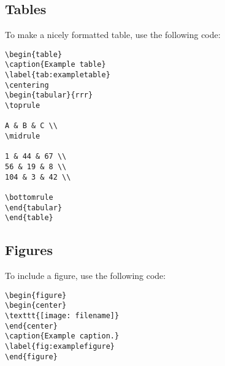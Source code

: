 \documentclass{article}
\begin{document}
\subsection{Tables}

To make a nicely formatted table, use the following code:

\begin{verbatim}
\begin{table}
\caption{Example table}
\label{tab:exampletable}
\centering
\begin{tabular}{rrr}
\toprule

A & B & C \\
\midrule

1 & 44 & 67 \\
56 & 19 & 8 \\
104 & 3 & 42 \\

\bottomrule
\end{tabular}
\end{table}
\end{verbatim}

\subsection{Figures}

To include a figure, use the following code:
\begin{verbatim}
\begin{figure}
\begin{center}
\texttt{[image: filename]}
\end{center}
\caption{Example caption.}
\label{fig:examplefigure}
\end{figure}
\end{verbatim}

\end{document}
